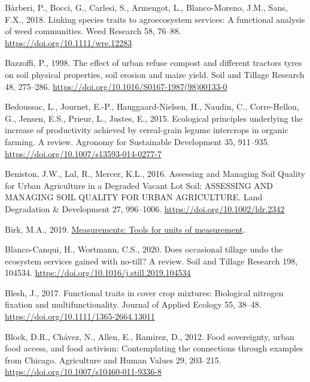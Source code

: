 \documentclass[
  12pt,
]{article}
\newlength{\cslhangindent}
\newlength{\cslentryspacingunit} %
\newenvironment{CSLReferences}[2] %
 {%
  \setlength{\parindent}{0pt}
  \ifodd #1
  \let\oldpar\par
  \def\par{\hangindent=\cslhangindent\oldpar}
  \fi
  \setlength{\parskip}{#2\cslentryspacingunit}
 }%
 {}
\begin{document}
\begin{CSLReferences}{1}{0}
\leavevmode{}%
Bàrberi, P., Bocci, G., Carlesi, S., Armengot, L., Blanco-Moreno, J.M., Sans, F.X., 2018. Linking species traits to agroecosystem services: A functional analysis of weed communities. Weed Research 58, 76--88. \url{https://doi.org/10.1111/wre.12283}

\leavevmode{}%
Bazzoffi, P., 1998. The effect of urban refuse compost and different tractors tyres on soil physical properties, soil erosion and maize yield. Soil and Tillage Research 48, 275--286. \url{https://doi.org/10.1016/S0167-1987(98)00133-0}

\leavevmode{}%
Bedoussac, L., Journet, E.-P., Hauggaard-Nielsen, H., Naudin, C., Corre-Hellou, G., Jensen, E.S., Prieur, L., Justes, E., 2015. Ecological principles underlying the increase of productivity achieved by cereal-grain legume intercrops in organic farming. {A} review. Agronomy for Sustainable Development 35, 911--935. \url{https://doi.org/10.1007/s13593-014-0277-7}

\leavevmode{}%
Beniston, J.W., Lal, R., Mercer, K.L., 2016. Assessing and {Managing Soil Quality} for {Urban Agriculture} in a {Degraded Vacant Lot Soil}: {ASSESSING AND MANAGING SOIL QUALITY FOR URBAN AGRICULTURE}. Land Degradation \& Development 27, 996--1006. \url{https://doi.org/10.1002/ldr.2342}

\leavevmode{}%
Birk, M.A., 2019. \href{https://CRAN.R-project.org/package=measurements}{Measurements: Tools for units of measurement}.

\leavevmode{}%
Blanco-Canqui, H., Wortmann, C.S., 2020. Does occasional tillage undo the ecosystem services gained with no-till? {A} review. Soil and Tillage Research 198, 104534. \url{https://doi.org/10.1016/j.still.2019.104534}

\leavevmode{}%
Blesh, J., 2017. Functional traits in cover crop mixtures: {Biological} nitrogen fixation and multifunctionality. Journal of Applied Ecology 55, 38--48. \url{https://doi.org/10.1111/1365-2664.13011}

\leavevmode{}%
Block, D.R., Chávez, N., Allen, E., Ramirez, D., 2012. Food sovereignty, urban food access, and food activism: Contemplating the connections through examples from {Chicago}. Agriculture and Human Values 29, 203--215. \url{https://doi.org/10.1007/s10460-011-9336-8}


\end{CSLReferences}
\end{document}
